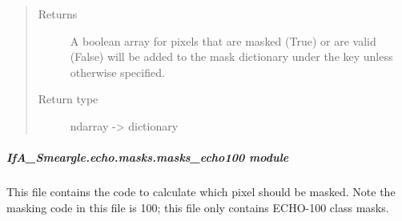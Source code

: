 \documentclass[letterpaper,10pt,english]{sphinxmanual}
\begin{document}
\begin{fulllineitems}
\begin{quote}
\begin{description}
\begin{itemize}
\end{itemize}

\item[{Returns}] \leavevmode
{} \textendash{} A boolean array for pixels that are masked (True) or are valid
(False) will be added to the mask dictionary under the
key  unless otherwise specified.

\item[{Return type}] \leavevmode
ndarray -\textgreater{} dictionary

\end{description}\end{quote}

\end{fulllineitems}



\subparagraph{IfA\_Smeargle.echo.masks.masks\_echo100 module}
\label{\detokenize{python_docstrings/IfA_Smeargle.echo.masks.masks_echo100:module-IfA_Smeargle.echo.masks.masks_echo100}}\label{\detokenize{python_docstrings/IfA_Smeargle.echo.masks.masks_echo100:ifa-smeargle-echo-masks-masks-echo100-module}}\label{\detokenize{python_docstrings/IfA_Smeargle.echo.masks.masks_echo100::doc}}
This file contains the code to calculate which pixel should be masked. Note the masking code
in this file is 100; this file only contains ECHO-100 class masks.
\end{document}
